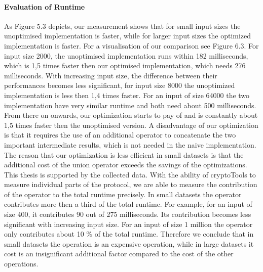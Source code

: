 \paragraph{Evaluation of Runtime}
As Figure 5.3 depicts, our measurement shows that for small input sizes the unoptimised implementation is faster, while for larger input sizes the optimized implementation is faster. For a visualisation of our comparison see Figure 6.3. For input size 2000, the unoptimised implementation runs within 182 milliseconds, which is 1,5 times faster then our optimised implementation, which needs 276 milliseconds. With increasing input size, the difference between their performances becomes less significant, for input size 8000 the unoptimized implementation is less then 1,4 times faster. For an input of size 64000 the two implementation have very similar runtime and both need about 500 milliseconds. From there on onwards, our optimization starts to pay of and is constantly about 1,5 times faster then the unoptimised version.  
A disadvantage of our optimization is that it requires the use of an additional  operator to concatenate the two important intermediate results, which is not needed in the naive implementation. The reason that our optimization is less efficient in small datasets is that the additional cost of the union operator exceeds the savings of the optimizations. This thesis is supported by the collected data. With the ability of cryptoTools to measure individual parts of the protocol, we are able to measure the contribution of the  operator to the total runtime precisely. In small datasets the  operator contributes more then a third of the total runtime. For example, for an input of size 400, it contributes 90 out of 275 milliseconds. Its contribution becomes less significant with increasing input size. For an input of size 1 million the  operator only contributes about 10 \% of the total runtime. Therefore we conclude that in small datasets the  operation is an expensive operation, while in large datasets it cost is an insignificant additional factor compared to the cost of the other operations. 

